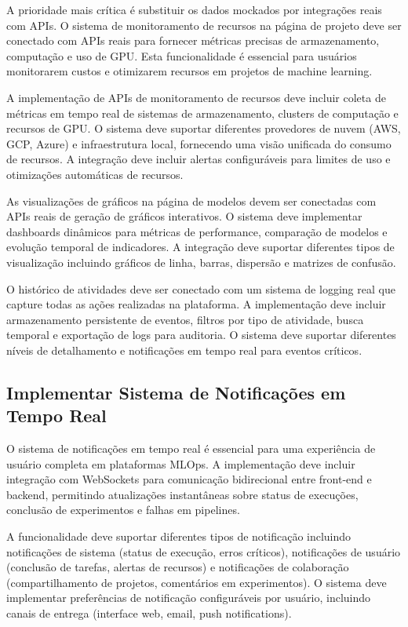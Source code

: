 \documentclass[12pt,a4paper]{article}
\begin{document}
A prioridade mais crítica é substituir os dados mockados por integrações reais com APIs. O sistema de monitoramento de recursos na página de projeto deve ser conectado com APIs reais para fornecer métricas precisas de armazenamento, computação e uso de GPU. Esta funcionalidade é essencial para usuários monitorarem custos e otimizarem recursos em projetos de machine learning.

A implementação de APIs de monitoramento de recursos deve incluir coleta de métricas em tempo real de sistemas de armazenamento, clusters de computação e recursos de GPU. O sistema deve suportar diferentes provedores de nuvem (AWS, GCP, Azure) e infraestrutura local, fornecendo uma visão unificada do consumo de recursos. A integração deve incluir alertas configuráveis para limites de uso e otimizações automáticas de recursos.

As visualizações de gráficos na página de modelos devem ser conectadas com APIs reais de geração de gráficos interativos. O sistema deve implementar dashboards dinâmicos para métricas de performance, comparação de modelos e evolução temporal de indicadores. A integração deve suportar diferentes tipos de visualização incluindo gráficos de linha, barras, dispersão e matrizes de confusão.

O histórico de atividades deve ser conectado com um sistema de logging real que capture todas as ações realizadas na plataforma. A implementação deve incluir armazenamento persistente de eventos, filtros por tipo de atividade, busca temporal e exportação de logs para auditoria. O sistema deve suportar diferentes níveis de detalhamento e notificações em tempo real para eventos críticos.

\subsection{Implementar Sistema de Notificações em Tempo Real}

O sistema de notificações em tempo real é essencial para uma experiência de usuário completa em plataformas MLOps. A implementação deve incluir integração com WebSockets para comunicação bidirecional entre front-end e backend, permitindo atualizações instantâneas sobre status de execuções, conclusão de experimentos e falhas em pipelines.

A funcionalidade deve suportar diferentes tipos de notificação incluindo notificações de sistema (status de execução, erros críticos), notificações de usuário (conclusão de tarefas, alertas de recursos) e notificações de colaboração (compartilhamento de projetos, comentários em experimentos). O sistema deve implementar preferências de notificação configuráveis por usuário, incluindo canais de entrega (interface web, email, push notifications).
\end{document}
